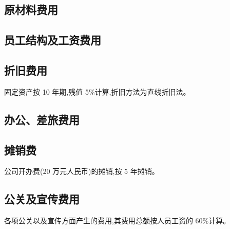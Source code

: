 \subsection{原材料费用}
\subsection{员工结构及工资费用}
\subsection{折旧费用}
固定资产按 10 年期,残值 5\%计算,折旧方法为直线折旧法。
\subsection{办公、差旅费用}
\subsection{摊销费}
公司开办费(20 万元人民币)的摊销,按 5 年摊销。
\subsection{公关及宣传费用}
各项公关以及宣传方面产生的费用,其费用总额按人员工资的 60\%计算。
